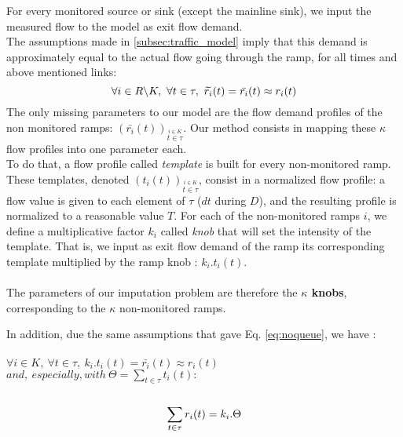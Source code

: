 For every monitored source or sink (except the mainline sink), we input the measured flow to the model as exit flow demand.\\ The assumptions made in \ref{subsec:traffic_model} imply that this demand is approximately equal to the actual flow going through the ramp, for all times and above mentioned links:\\
\begin{equation}
	\label{eq:noqueue}
	\forall i\in R\backslash K,\ \forall t\in \tau,\ \widetilde{r_{i}}(t)=\bar{r_{i}}(t)\approx {r_{i}}(t)\\
\end{equation}
The only missing parameters to our model are the flow demand profiles of the non monitored ramps: $(\bar{r_{i}}(t))_{\stackrel{i\in K}{t \in{\tau}}}$.
Our method consists in mapping these $\kappa$ flow profiles into one parameter each.\\
To do that, a flow profile called \emph{template} is built for every non-monitored ramp. These templates, denoted $(t_{i}(t))_{\stackrel{i\in{K}}{t \in{\tau}}}$, consist in a normalized flow profile: a flow value is given to each element of $\tau$ ($dt$ during $D$), and the resulting profile is normalized to a reasonable value $T$.
For each of the non-monitored ramps $i$, we define a multiplicative factor $k_{i}$ called \emph{knob} that will set the intensity of the template. 
That is, we input as exit flow demand of the ramp its corresponding template multiplied by the ramp knob : $k_{i}.t_{i}(t)$.\\
\\
The parameters of our imputation problem are therefore the \textbf{$\kappa$ knobs}, corresponding to the $\kappa$ non-monitored ramps.

In addition, due the same assumptions that gave Eq. \ref{eq:noqueue}, we have :\\
\\
$\forall i \in K,\ \forall t\in \tau,\ k_{i}.t_{i}(t)=\bar{r_{i}}(t)\approx r_{i}(t)$\\
$and,\ especially, with\ \Theta=\sum\limits_{t\in\tau}t_{i}(t):$\\
\\
\begin{equation}
	\label{eq:noqueuetemplate}
	\sum\limits_{t \in \tau} r_{i}(t)=k_{i}.\Theta\\
\end{equation}